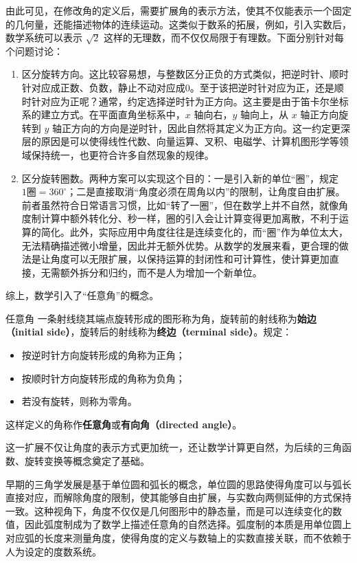 由此可见，在修改角的定义后，需要扩展角的表示方法，使其不仅能表示一个固定的几何量，还能描述物体的连续运动。这类似于数系的拓展，例如，引入实数后，数学系统可以表示 $\sqrt{2}$ 这样的无理数，而不仅仅局限于有理数。下面分别针对每个问题讨论：
\begin{enumerate}
\item 区分旋转方向。这比较容易想，与整数区分正负的方式类似，把逆时针、顺时针对应成正数、负数，静止不动对应成$0$。至于该把逆时针对应为正，还是顺时针对应为正呢？通常，约定选择逆时针为正方向。这主要是由于笛卡尔坐标系的建立方式。在平面直角坐标系中，$x$ 轴向右，$y$ 轴向上，从 $x$ 轴正方向旋转到 $y$ 轴正方向的方向是逆时针，因此自然将其定义为正方向。这一约定更深层的原因是可以使得线性代数、向量运算、叉积、电磁学、计算机图形学等领域保持统一，也更符合许多自然现象的规律。
\item 区分旋转圈数。两种方案可以实现这个目的：一是引入新的单位“圈”，规定$1\text{圈}=360^\circ$；二是直接取消“角度必须在周角以内”的限制，让角度自由扩展。前者虽然符合日常语言习惯，比如“转了一圈”，但在数学上并不自然，就像角度制计算中额外转化分、秒一样，圈的引入会让计算变得更加离散，不利于运算的简化。此外，实际应用中角度往往是连续变化的，而“圈”作为单位太大，无法精确描述微小增量，因此并无额外优势。从数学的发展来看，更合理的做法是让角度可以无限扩展，以保持运算的封闭性和可计算性，使计算更加直接，无需额外拆分和归约，而不是人为增加一个新单位。
\end{enumerate}

综上，数学引入了“任意角”的概念。

\begin{definition}{任意角}
一条射线绕其端点旋转形成的图形称为角，旋转前的射线称为\textbf{始边（initial side）}，旋转后的射线称为\textbf{终边（terminal side）}。规定：
\begin{itemize}
\item 按逆时针方向旋转形成的角称为正角；
\item 按顺时针方向旋转形成的角称为负角；
\item 若没有旋转，则称为零角。
\end{itemize}
这样定义的角称作\textbf{任意角}或\textbf{有向角（directed angle）}。
\end{definition}

这一扩展不仅让角度的表示方式更加统一，还让数学计算更自然，为后续的三角函数、旋转变换等概念奠定了基础。

早期的三角学发展是基于单位圆和弧长的概念，单位圆的思路使得角度可以与弧长直接对应，而解除角度的限制，使其能够自由扩展，与实数向两侧延伸的方式保持一致。这种视角下，角度不仅仅是几何图形中的静态量，而是可以连续变化的数值，因此弧度制成为了数学上描述任意角的自然选择。弧度制的本质是用单位圆上对应弧的长度来测量角度，使得角度的定义与数轴上的实数直接关联，而不依赖于人为设定的度数系统。


